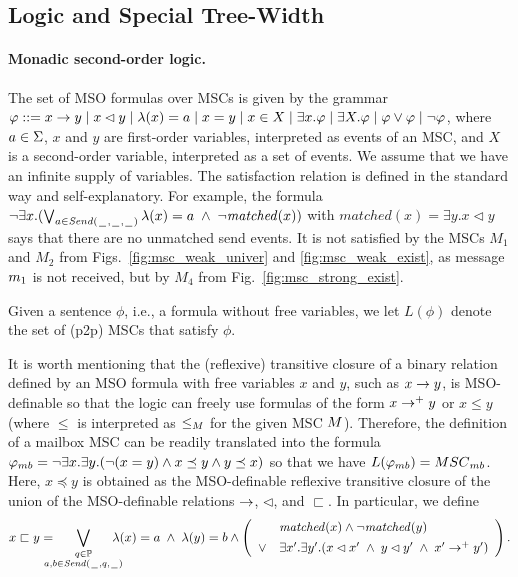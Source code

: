 \documentclass[a4paper,UKenglish,cleveref, autoref, thm-restate]{lipics-v2021}
\begin{document}
\subsection{Logic and Special Tree-Width}

\paragraph*{Monadic second-order logic.}
The set of MSO formulas over MSCs is given by the grammar
$
\varphi ::= x \to y \mid x \lhd y \mid \lambda(x) = a \mid x = y \mid x \in X \mid \exists x.\varphi \mid \exists X.\varphi \mid \varphi \vee \varphi \mid \neg \varphi
$,
where $a \in \Sigma$, $x$ and $y$ are first-order variables, interpreted as
events of an MSC, and $X$ is a second-order variable, interpreted
as a set of events. We assume that we have an infinite supply of variables.
The satisfaction relation is defined in the standard way and self-explanatory.
For example, the formula $\neg\exists x.(\bigvee_{a \in {\mathit{Send}(\hspace{0.1em}\underline{\hspace{0.5em}}\hspace{0.1em},\hspace{0.1em}\underline{\hspace{0.5em}}\hspace{0.1em},\hspace{0.1em}\underline{\hspace{0.5em}}\hspace{0.1em})}} \lambda(x) = a \;\wedge\; \neg \mathit{matched}(x))$
with $\mathit{matched}(x) = \exists y.x \lhd y$
says that there are no unmatched send events.
It is not satisfied by the MSCs $M_1$ and $M_2$
from Figs.~\ref{fig:msc_weak_univer} and \ref{fig:msc_weak_exist},
as message $m_1$ is not received,
but by $M_4$ from Fig.~\ref{fig:msc_strong_exist}.

Given a sentence $\phi$, i.e., a formula without free variables,
we let $L(\phi)$ denote the set of (p2p) MSCs that satisfy $\phi$.

It is worth mentioning that the (reflexive) transitive closure of
a binary relation defined by an MSO formula with free variables $x$ and $y$,
such as $x \to y$, is MSO-definable so that the logic can freely
use formulas of the form $x \to^+ y$ or $x \le y$ (where $\le$
is interpreted as $\le_M$ for the given MSC $M$).
Therefore, the definition of a mailbox MSC can be readily translated into
the formula $\mbformula = \neg \exists x.\exists y.(\neg (x = y) \wedge x \preceq y \wedge y \preceq x)$ so that we have $L(\mbformula) = \mbMSCs$.
Here, $x \preceq y$ is obtained as the MSO-definable reflexive transitive closure of
the union of the MSO-definable relations $\to$, $\lhd$, and $\sqsubset$.
In particular, we define
\[
x \sqsubset y =
\displaystyle
\hspace{-1em}\bigvee_{\substack{q \in \mathbb{P}\\a,b \in {\mathit{Send}(\hspace{0.1em}\underline{\hspace{0.5em}}\hspace{0.1em},q,\hspace{0.1em}\underline{\hspace{0.5em}}\hspace{0.1em})}}}\hspace{-1em}
\lambda(x) = a \;\wedge\; \lambda(y) = b
\wedge
\left(
\begin{array}{rl}
& \mathit{matched}(x) \wedge \neg \mathit{matched}(y)\\[1ex]
\vee & \exists x'.\exists y'. (x \lhd x' \;\wedge\; y \lhd y' \;\wedge\; x' \to^+ y')
\end{array}
\right).
\]
\end{document}
